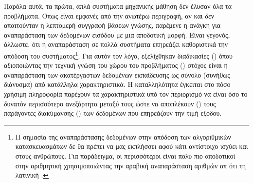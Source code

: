 Παρόλα αυτά, τα πρώτα, απλά συστήματα μηχανικής μάθηση δεν έλυσαν όλα τα προβλήματα. Όπως είναι εμφανές από την ανωτέρω περιγραφή, αν και δεν απαιτούνταν η λεπτομερή συγγραφή βάσεων γνώσης, παρέμενε η ανάγκη για αναπαράσταση των δεδομένων εισόδου με μια αποδοτική μορφή. Είναι γεγονός, άλλωστε, ότι η αναπαράσταση σε πολλά συστήματα επηρεάζει καθοριστικά την απόδοση του συστήματος\footnote{Η σημασία της αναπαράστασης δεδομένων στην απόδοση των αλγοριθμικών κατασκευασμάτων δε θα πρέπει να μας εκπλήσσει αφού κάτι αντίστοιχο ισχύει και στους ανθρώπους. Για παράδειγμα, οι περισσότεροι είναι πολύ πιο αποδοτικοί στην αριθμητική χρησιμοποιώντας την αραβική αναπαράσταση αριθμών απ ότι τη λατινική \cite{goodfellow2016deep}.}. Για αυτόν τον λόγο, εξελίχθηκαν διαδικασίες  () όπου αξιοποιώντας την τεχνική γνώση του χώρου του προβλήματος () στόχος είναι η αναπαράσταση των ακατέργαστων δεδομένων εκπαίδευσης ως σύνολο (συνήθως διάνυσμα) από κατάλληλα χαρακτηριστικά. Η καταλληλότητα έγκειται στο πόσο χρήσιμη πληροφορία παρέχουν τα χαρακτηριστικά υπό τον περιορισμό να είναι όσο το δυνατόν περισσότερο ανεξάρτητα μεταξύ τους ώστε να αποπλέκουν () τους παράγοντες διακύμανσης () των δεδομένων που επηρεάζουν την τιμή εξόδου\cite{goodfellow2016deep}. \par

